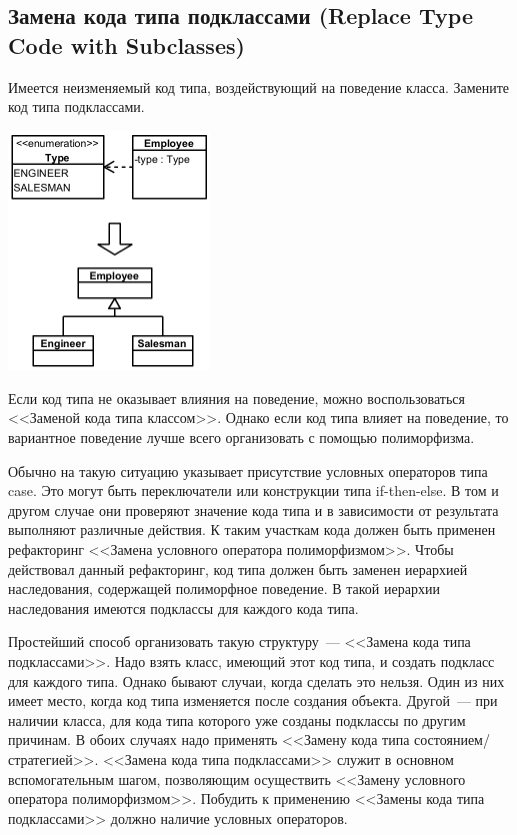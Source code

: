 \documentclass{../../text-style}
\begin{document}
\subsection{Замена кода типа подклассами (Replace Type Code with Subclasses)}

Имеется неизменяемый код типа, воздействующий на поведение класса. Замените код типа подклассами.

\begin{center}
    \includegraphics[width=0.4\textwidth]{replaceTypeCodeWithSubclass.png}
\end{center}

Если код типа не оказывает влияния на поведение, можно воспользоваться <<Заменой кода типа классом>>. Однако если код типа влияет на поведение, то вариантное поведение лучше всего организовать с помощью полиморфизма.

Обычно на такую ситуацию указывает присутствие условных операторов типа case. Это могут быть переключатели или конструкции типа if-then-else. В том и другом случае они проверяют значение кода типа и в зависимости от результата выполняют различные действия. К таким участкам кода должен быть применен рефакторинг <<Замена условного оператора полиморфизмом>>. Чтобы действовал данный рефакторинг, код типа должен быть заменен иерархией наследования, содержащей полиморфное поведение. В такой иерархии наследования имеются подклассы для каждого кода типа.

Простейший способ организовать такую структуру~--- <<Замена кода типа подклассами>>. Надо взять класс, имеющий этот код типа, и создать подкласс для каждого типа. Однако бывают случаи, когда сделать это нельзя. Один из них имеет место, когда код типа изменяется после создания объекта. Другой~--- при наличии класса, для кода типа которого уже созданы подклассы по другим причинам. В обоих случаях надо применять <<Замену кода типа состоянием/стратегией>>. <<Замена кода типа подклассами>> служит в основном вспомогательным шагом, позволяющим осуществить <<Замену условного оператора полиморфизмом>>. Побудить к применению <<Замены кода типа подклассами>> должно наличие условных операторов.
\end{document}
